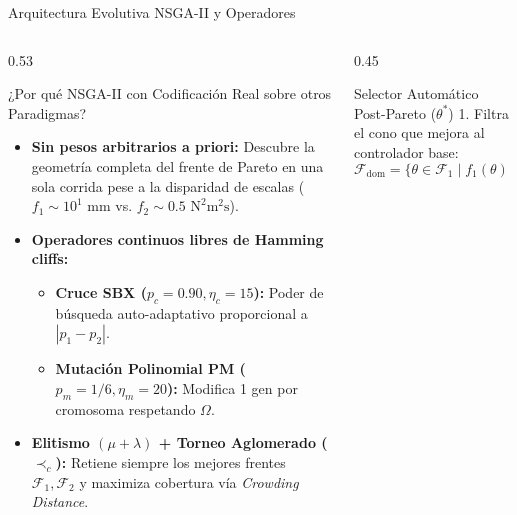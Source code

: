 \documentclass[aspectratio=169,9pt]{beamer}
\begin{document}
\begin{frame}{Arquitectura Evolutiva NSGA-II y Operadores}
\vspace{-0.15cm}
\begin{columns}[T,onlytextwidth]
\begin{column}{0.53\textwidth}
    \begin{block}{\footnotesize ¿Por qué NSGA-II con Codificación Real sobre otros Paradigmas?}
        \scriptsize
        \begin{itemize}\setlength{\itemsep}{2pt}
            \item \textbf{Sin pesos arbitrarios a priori:} Descubre la geometría completa del frente de Pareto en una sola corrida pese a la disparidad de escalas ($f_1 \sim 10^1\text{ mm}$ vs. $f_2 \sim 0.5\text{ N}^2\text{m}^2\text{s}$).
            \item \textbf{Operadores continuos libres de Hamming cliffs:}
            \begin{itemize}\setlength{\itemsep}{1pt}
                \item \scriptsize \textbf{Cruce SBX ($p_c=0.90, \eta_c=15$):} Poder de búsqueda auto-adaptativo proporcional a $|p_1 - p_2|$.
                \item \scriptsize \textbf{Mutación Polinomial PM ($p_m=1/6, \eta_m=20$):} Modifica 1 gen por cromosoma respetando $\Omega$.
            \end{itemize}
            \item \textbf{Elitismo $(\mu+\lambda)$ + Torneo Aglomerado ($\prec_c$):} Retiene siempre los mejores frentes $\mathcal{F}_1, \mathcal{F}_2$ y maximiza cobertura vía \textit{Crowding Distance}.
        \end{itemize}
    \end{block}
\end{column}
\begin{column}{0.45\textwidth}
    \begin{exampleblock}{\footnotesize Selector Automático Post-Pareto ($\theta^*$)}
        \scriptsize
        1. Filtra el cono que mejora al controlador base:
        \vspace{-0.15cm}
        \[
            \mathcal{F}_{\text{dom}} = \{\theta \in \mathcal{F}_1 \mid f_1(\theta) \le f_1(\theta_{\text{base}})\}
        \]
        \vspace{-0.15cm}

\end{exampleblock}
\end{column}
\end{columns}
\end{frame}
\end{document}
